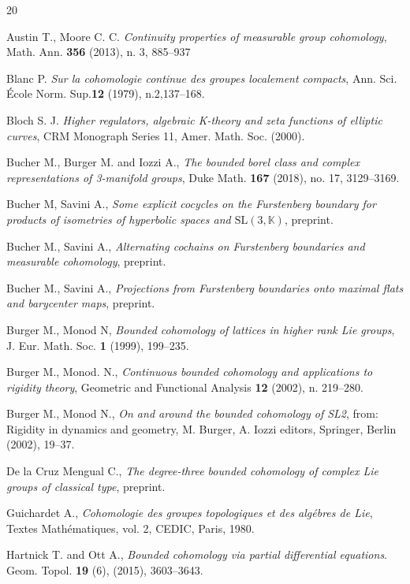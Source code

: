 \documentclass[a4paper]{amsart}
\theoremstyle{definition}
\theoremstyle{remark}
\theoremstyle{TheoremNum}
\begin{document}

\begin{thebibliography}{20}

 Austin T., Moore C. C. 
\emph{Continuity properties of measurable group cohomology}, Math. Ann. {\bf 356} (2013), n. 3, 885--937

 Blanc P. 
\emph{Sur la cohomologie continue des groupes localement compacts}, Ann. Sci. \'Ecole Norm. Sup.{\bf 12} (1979), n.2,137--168.

 Bloch S. J. \emph{Higher regulators, algebraic K-theory and zeta functions of elliptic curves}, CRM Monograph Series 11, Amer. Math. Soc. (2000).

 Bucher M., Burger M. and Iozzi A., \emph{The bounded borel class and complex representations of
3-manifold groups}, Duke Math. {\bf 167} (2018), no. 17, 3129--3169.

 Bucher M, Savini A., \emph{Some explicit cocycles on the Furstenberg boundary for products of isometries of hyperbolic spaces and $\mathrm{SL}(3,\mathbb{K})$}, preprint.

 Bucher M., Savini A., \emph{Alternating cochains on Furstenberg boundaries and measurable cohomology}, preprint.

 Bucher M., Savini A., \emph{Projections from Furstenberg boundaries onto maximal flats and barycenter maps}, preprint. 

 Burger M., Monod N, \emph{Bounded cohomology of lattices in higher rank Lie groups}, J. Eur.
Math. Soc. \textbf{1} (1999), 199--235.

 Burger M., Monod. N., \emph{Continuous bounded cohomology and applications to rigidity
theory}, Geometric and Functional Analysis {\bf 12} (2002), n. 219--280.

 Burger M., Monod N., \emph{On and around the bounded cohomology of SL2}, from: Rigidity in dynamics and geometry, {M. Burger, A. Iozzi editors}, Springer, Berlin (2002), 19--37.

 De la Cruz Mengual C., \emph{The degree-three bounded cohomology of complex Lie groups of classical type},
preprint.

  Guichardet A., \emph{Cohomologie des groupes topologiques et des alg\'ebres de Lie}, Textes
Math\'ematiques, vol. 2, CEDIC, Paris, 1980.

 Hartnick T. and Ott A., \emph{Bounded cohomology via partial differential equations}. Geom. Topol.
{\bf 19} (6), (2015), 3603--3643.


\end{thebibliography}
\end{document}
